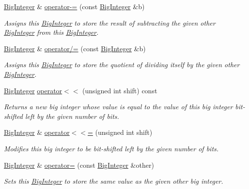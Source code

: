 \begin{DoxyCompactItemize}
\mbox{\hyperlink{classBigInteger}{Big\+Integer}} \& \mbox{\hyperlink{classBigInteger_a2384a7b6f8db40412a81c7bf584e0819}{operator-\/=}} (const \mbox{\hyperlink{classBigInteger}{Big\+Integer}} \&b)
\begin{DoxyCompactList}\small\item\em Assigns this \mbox{\hyperlink{classBigInteger}{Big\+Integer}} to store the result of subtracting the given other \mbox{\hyperlink{classBigInteger}{Big\+Integer}} from this \mbox{\hyperlink{classBigInteger}{Big\+Integer}}. \end{DoxyCompactList}\item 
\mbox{\hyperlink{classBigInteger}{Big\+Integer}} \& \mbox{\hyperlink{classBigInteger_a15911ed7a428e4802403903565e74824}{operator/=}} (const \mbox{\hyperlink{classBigInteger}{Big\+Integer}} \&b)
\begin{DoxyCompactList}\small\item\em Assigns this \mbox{\hyperlink{classBigInteger}{Big\+Integer}} to store the quotient of dividing itself by the given other \mbox{\hyperlink{classBigInteger}{Big\+Integer}}. \end{DoxyCompactList}\item 
\mbox{\hyperlink{classBigInteger}{Big\+Integer}} \mbox{\hyperlink{classBigInteger_ac842accc04bc67769d5ac269f4a7a3f4}{operator$<$$<$}} (unsigned int shift) const
\begin{DoxyCompactList}\small\item\em Returns a new big integer whose value is equal to the value of this big integer bit-\/shifted left by the given number of bits. \end{DoxyCompactList}\item 
\mbox{\hyperlink{classBigInteger}{Big\+Integer}} \& \mbox{\hyperlink{classBigInteger_a339098d3b2c04e1bd7bf883e460f5aea}{operator$<$$<$=}} (unsigned int shift)
\begin{DoxyCompactList}\small\item\em Modifies this big integer to be bit-\/shifted left by the given number of bits. \end{DoxyCompactList}\item 
\mbox{\hyperlink{classBigInteger}{Big\+Integer}} \& \mbox{\hyperlink{classBigInteger_ac2c411cecad98a599e38ad10f1e27e45}{operator=}} (const \mbox{\hyperlink{classBigInteger}{Big\+Integer}} \&other)
\begin{DoxyCompactList}\small\item\em Sets this \mbox{\hyperlink{classBigInteger}{Big\+Integer}} to store the same value as the given other big integer. \end{DoxyCompactList}\item 

\end{DoxyCompactItemize}
